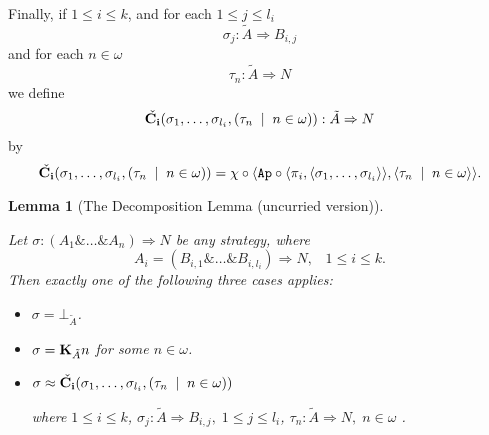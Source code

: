\documentclass[11pt]{article}
\newtheorem{lemma}[theorem]{Lemma}
\newcommand{\with}{\mbox{$\&$}}
\newcommand{\lang}{\langle}
\newcommand{\rang}{\rangle}
\begin{document}
Finally, if $1\leq i\leq k$, and for each $1\leq j\leq l_i$
$$\sigma_j:\tilde{A}\Rightarrow B_{i,j}$$
and for each $n\in\omega$
$$\tau_n:\tilde{A}\Rightarrow N$$
we define
$$\check{{\bf C_i}}(\sigma_1,\dots,\sigma_{l_i},(\tau_n\;\mid \;
n\in\omega)):\tilde{A}\Rightarrow N$$
by
$$\check{{\bf C_i}}(\sigma_1,\dots,\sigma_{l_i},(\tau_n\;\mid \; n\in\omega))
=\chi\circ\lang {\tt Ap}\circ\lang\pi_i,\lang\sigma_1,\dots,\sigma_{l_i}\rang \rang ,\lang\tau_n\;\mid \;
n\in\omega\rang \rang. $$
\begin{lemma}[The Decomposition Lemma (uncurried version)]\label{lem7}

Let $\sigma:(A_1\with\dots\with A_n)\Rightarrow N$ be any strategy,
where
$$A_i=(B_{i,1}\with\dots\with B_{i,l_i})\Rightarrow N ,\;\;\;
1\leq i\leq k.$$
Then exactly one of the following three cases applies:
\begin{itemize}
\item[(i)] $\sigma=\bot_{\tilde{A}}$.
\item[(ii)] $\sigma={\bf K}_{\tilde{A}}n$ for some $n\in\omega$.
\item[(iii)] $\sigma\approx
  \check{{\bf C_i}}(\sigma_1,\dots,\sigma_{l_i},(\tau_n\;\mid \; n\in\omega))$

where $1\leq i\leq k$, $\sigma_j:\tilde{A}\Rightarrow B_{i,j},\; 1\leq
j\leq l_i$, $\tau_n:\tilde{A}\Rightarrow N,\; n\in\omega$ .
\end{itemize}
\end{lemma}
\end{document}
